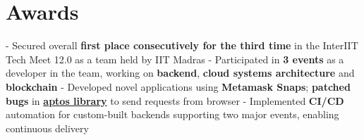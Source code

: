\documentclass[a4paper,10pt]{extarticle} %
\begin{document}
\section{\textcolor{primary}{Awards}}
 \vspace{0.1cm}
\begin{description}[style=nextline, font=$\bullet$\hspace{2mm}\normalsize]

 \item[{\href{https://interiit-tech.org/}{InterIIT Tech Meet 12.0}} | Contingent Gold ] 
- Secured overall \textbf{first place consecutively for the third time} in the InterIIT Tech Meet 12.0 as a team held by IIT Madras \newline
- Participated in \textbf{3 events} as a developer in the team, working on \textbf{backend}, \textbf{cloud systems architecture} and \textbf{blockchain} \newline
- Developed novel applications using \textbf{Metamask Snaps}; \textbf{patched bugs} in \href{https://github.com/aptos-labs/aptos-core}{\textbf{aptos library}} to send requests from browser \newline
- Implemented \textbf{CI/CD} automation for custom-built backends supporting two major events, enabling continuous delivery
\end{description}

 \vspace{-0.1cm}
\end{document}
